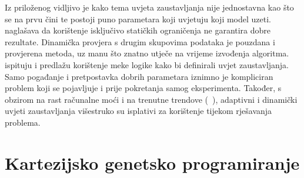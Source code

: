 Iz priloženog vidljivo je kako tema uvjeta zaustavljanja nije jednostavna kao što se na prvu čini te postoji puno parametara koji uvjetuju koji model uzeti.
~\cite{ga_stopping_criteria} naglašava da korištenje isključivo statičkih ograničenja ne garantira dobre rezultate.
Dinamička provjera s drugim skupovima podataka je pouzdana i provjerena metoda, uz manu što znatno utječe na vrijeme izvođenja algoritma.
~\cite{fuzzy_logic} ispituju i predlažu korištenje meke logike kako bi definirali uvjet zaustavljanja.
Samo pogađanje i pretpostavka dobrih parametara iznimno je kompliciran problem koji se pojavljuje i prije pokretanja samog eksperimenta.
Također, s obzirom na rast računalne moći i na trenutne trendove (~\cite{ga_stopping_criteria}), adaptivni i dinamički uvjeti zaustavljanja višestruko su isplativi za korištenje tijekom rješavanja problema.

\section{Kartezijsko genetsko programiranje}


